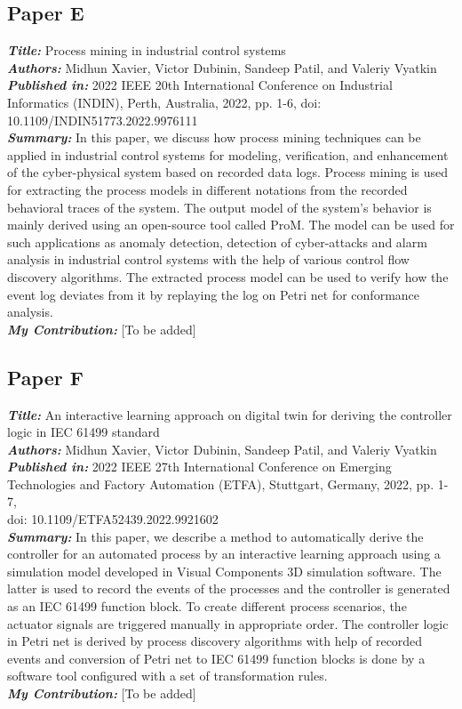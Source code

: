 \subsection{Paper E}
\textbf{\textit{Title:}} Process mining in industrial control systems\\
\textbf{\textit{Authors:}} Midhun Xavier, Victor Dubinin, Sandeep Patil, and Valeriy Vyatkin\\
\textbf{\textit{Published in:}} 2022 IEEE 20th International Conference on Industrial Informatics (INDIN), Perth, Australia, 2022, pp. 1-6, doi: 10.1109/INDIN51773.2022.9976111\\
\textbf{\textit{Summary:}} In this paper, we discuss how process mining techniques can be applied in industrial control systems for modeling, verification, and enhancement of the cyber-physical system based on recorded data logs. Process mining is used for extracting the process models in different notations from the recorded behavioral traces of the system. The output model of the system's behavior is mainly derived using an open-source tool called ProM. The model can be used for such applications as anomaly detection, detection of cyber-attacks and alarm analysis in industrial control systems with the help of various control flow discovery algorithms. The extracted process model can be used to verify how the event log deviates from it by replaying the log on Petri net for conformance analysis.\\
\textbf{\textit{My Contribution:}} [To be added]

\subsection{Paper F}
\textbf{\textit{Title:}} An interactive learning approach on digital twin for deriving the controller logic in IEC 61499 standard\\
\textbf{\textit{Authors:}} Midhun Xavier, Victor Dubinin, Sandeep Patil, and Valeriy Vyatkin\\
\textbf{\textit{Published in:}} 2022 IEEE 27th International Conference on Emerging Technologies and Factory Automation (ETFA), Stuttgart, Germany, 2022, pp. 1-7,\\ doi: 10.1109/ETFA52439.2022.9921602\\
\textbf{\textit{Summary:}} In this paper, we describe a method to automatically derive the controller for an automated process by an interactive learning approach using a simulation model developed in Visual Components 3D simulation software. The latter is used to record the events of the processes and the controller is generated as an IEC 61499 function block. To create different process scenarios, the actuator signals are triggered manually in appropriate order. The controller logic in Petri net is derived by process discovery algorithms with help of recorded events and conversion of Petri net to IEC 61499 function blocks is done by a software tool configured with a set of transformation rules.\\
\textbf{\textit{My Contribution:}} [To be added]

